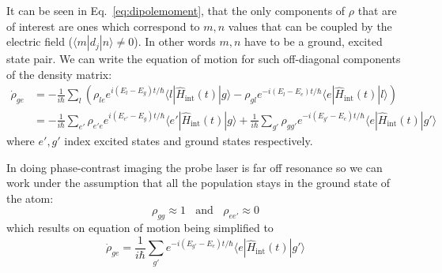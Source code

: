 \documentclass{article}[12pt]
\begin{document}
It can be seen in Eq.~\ref{eq:dipolemoment}, that the only components of $\rho$ that are of interest are ones which correspond to $m,n$ values that can be coupled by the electric field ($\langle m | d_{j} | n \rangle \neq 0$).  In other words $m,n$ have to be a ground, excited state pair. We can write the equation of motion for such off-diagonal components of the density matrix:
\begin{equation}
\begin{split}
\dot{\rho}_{ge} & =- \frac{1}{i\hbar} \sum_{l} \left( \rho_{le} e^{i(E_{l}-E_{g})t/\hbar} \langle l | \hat{H}_{\mathrm{int}}(t) | g \rangle - \rho_{gl} e^{-i(E_{l}-E_{e})t/\hbar} \langle e | \hat{H}_{\mathrm{int}}(t) | l \rangle \right) \\
 & = - \frac{1}{i\hbar } \sum_{e'}  \rho_{e'e} e^{i(E_{e'}-E_{g})t/\hbar} \langle e' | \hat{H}_{\mathrm{int}}(t) | g \rangle + \frac{1}{i\hbar } \sum_{g'} \rho_{gg'} e^{-i(E_{g'}-E_{e})t/\hbar} \langle e | \hat{H}_{\mathrm{int}}(t) | g' \rangle
\end{split}
\end{equation}
where $e',g'$ index excited states and ground states respectively. 

In doing phase-contrast imaging the probe laser is far off resonance so we can work under the assumption that all the population stays in the ground state of the atom:
\[
\rho_{gg} \approx 1 \ \ \ \  \mathrm{and} \ \ \ \  \rho_{ee'}\approx 0 
\]
which results on equation of motion being simplified to 
\[ \dot{\rho}_{ge} =   \frac{1}{i\hbar } \sum_{g'} e^{-i(E_{g'}-E_{e})t/\hbar} \langle e | \hat{H}_{\mathrm{int}}(t) | g' \rangle \]
\end{document}
